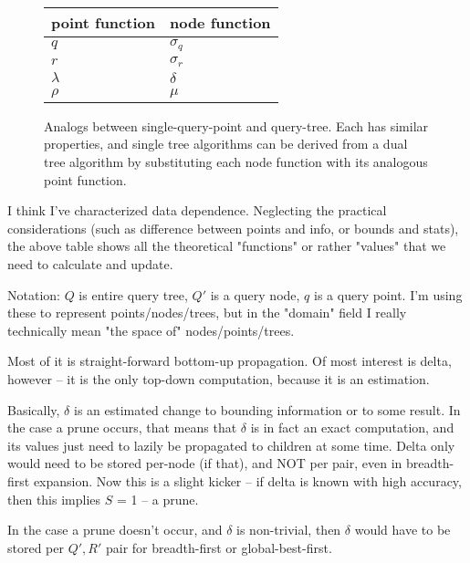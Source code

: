 \documentclass[11pt]{article}
\begin{document}
\begin{figure}

\begin{tabular}{|l|l|}
\hline
point function & node function
\\
\hline
$q$ & $\sigma_q$
\\
\hline
$r$ & $\sigma_r$
\\
\hline
$\lambda$ & $\delta$
\\
\hline
$\rho$ & $\mu$
\\
\hline
\end{tabular}

\caption{Analogs between single-query-point and query-tree.
Each has similar properties, and single tree algorithms can be derived from a dual tree
algorithm by substituting each node function with its analogous point function.
}
\end{figure}

I think I've characterized data dependence.  Neglecting the practical
considerations (such as difference between points and info, or bounds and
stats), the above table shows all the theoretical "functions" or rather
"values" that we need to calculate and update.

Notation: $Q$ is entire query tree, $Q'$ is a query node, $q$ is a query
point. I'm using these to represent points/nodes/trees, but in the "domain"
field I really technically mean "the space of" nodes/points/trees.

Most of it is straight-forward bottom-up propagation. Of most interest is
delta, however -- it is the only top-down computation, because it is an
estimation.

Basically, $\delta$ is an estimated change to bounding information or to
some result. In the case a prune occurs, that means that $\delta$ is in fact
an exact computation, and its values just need to lazily be propagated to
children at some time.  Delta only would need to be stored per-node (if
that), and NOT per pair, even in breadth-first expansion. Now this is a
slight kicker -- if delta is known with high accuracy, then this implies
$S$ = 1 -- a prune.

In the case a prune doesn't occur, and $\delta$ is non-trivial, then
$\delta$ would have to be stored per $Q', R'$ pair for breadth-first or
global-best-first.
\end{document}
